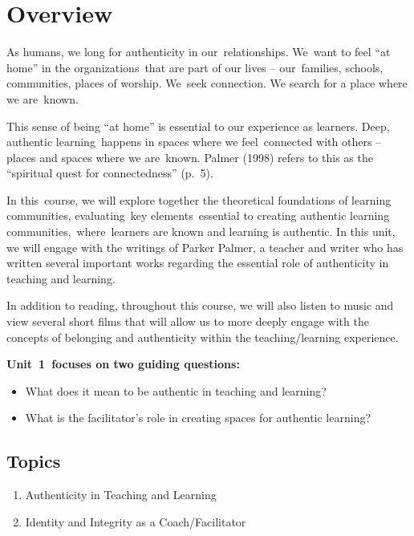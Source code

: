\documentclass[
]{book}
\providecommand{\tightlist}{%
  \setlength{\itemsep}{0pt}\setlength{\parskip}{0pt}}
\begin{document}
\hypertarget{overview}{%
\section*{Overview}\label{overview}}

As humans, we long for authenticity in our~relationships. We~want to feel ``at home'' in the organizations~that are part of our lives -- our~families, schools, communities, places of worship. We~seek connection. We search for a place where we are~known.

This sense of being ``at home'' is essential to our experience as learners. Deep, authentic learning~happens in spaces where we feel~connected with others -- places and spaces where we are~known. Palmer (1998) refers to this as the ``spiritual quest for connectedness'' (p.~5).

In this~course, we will explore together the theoretical foundations of learning communities, evaluating~key elements~essential to creating authentic learning communities,~where~learners are known and learning is authentic. In this unit, we will engage with the writings of Parker Palmer, a teacher and writer who has written several important works regarding the essential role of authenticity in teaching and learning.

In addition to reading, throughout this course, we will also listen to music and view several short films that will allow us to more deeply engage with the concepts of belonging and authenticity within the teaching/learning experience.

\textbf{Unit~1~focuses on two guiding questions:}

\begin{itemize}
\tightlist
\item
  What does it mean to be authentic in teaching and learning?\\
\item
  What is the facilitator's role in creating spaces for authentic learning?
\end{itemize}

\hypertarget{topics}{%
\subsection*{Topics}\label{topics}}

\begin{enumerate}
\def\labelenumi{\arabic{enumi}.}
\tightlist
\item
  Authenticity in Teaching and Learning\\
\item
  Identity and Integrity as a Coach/Facilitator
\end{enumerate}
\end{document}
